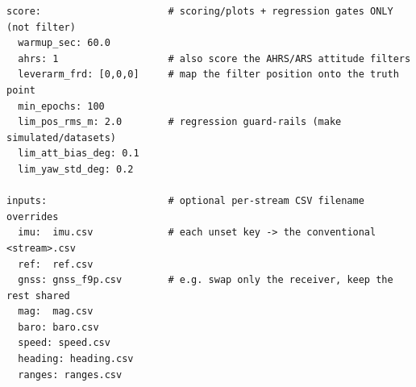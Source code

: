 \documentclass[11pt,a4paper]{article}
\begin{document}
\begin{lstlisting}[style=cfg]
score:                      # scoring/plots + regression gates ONLY (not filter)
  warmup_sec: 60.0
  ahrs: 1                   # also score the AHRS/ARS attitude filters
  leverarm_frd: [0,0,0]     # map the filter position onto the truth point
  min_epochs: 100
  lim_pos_rms_m: 2.0        # regression guard-rails (make simulated/datasets)
  lim_att_bias_deg: 0.1
  lim_yaw_std_deg: 0.2

inputs:                     # optional per-stream CSV filename overrides
  imu:  imu.csv             # each unset key -> the conventional <stream>.csv
  ref:  ref.csv
  gnss: gnss_f9p.csv        # e.g. swap only the receiver, keep the rest shared
  mag:  mag.csv
  baro: baro.csv
  speed: speed.csv
  heading: heading.csv
  ranges: ranges.csv
\end{lstlisting}
\end{document}
